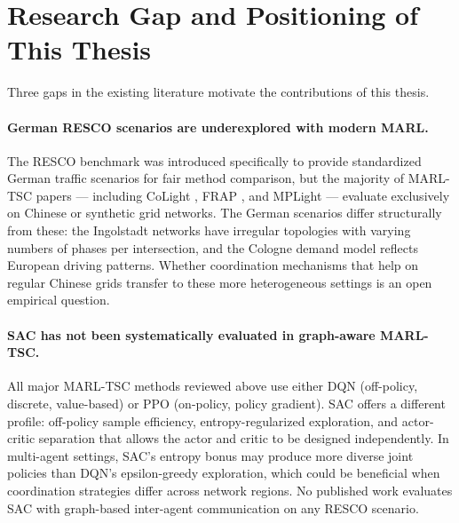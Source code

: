 \section{Research Gap and Positioning of This Thesis}
\label{sec:LiteratureReview_ResearchGap}

Three gaps in the existing literature motivate the contributions of this thesis.

\paragraph{German RESCO scenarios are underexplored with modern MARL.}
The RESCO benchmark \citep{ault2021reinforcement} was introduced specifically to provide standardized German traffic scenarios for fair method comparison, but the majority of MARL-TSC papers — including CoLight \citep{wei2019colight}, FRAP \citep{zheng2019learning}, and MPLight \citep{chen2020toward} — evaluate exclusively on Chinese or synthetic grid networks. The German scenarios differ structurally from these: the Ingolstadt networks have irregular topologies with varying numbers of phases per intersection, and the Cologne demand model reflects European driving patterns. Whether coordination mechanisms that help on regular Chinese grids transfer to these more heterogeneous settings is an open empirical question.

\paragraph{SAC has not been systematically evaluated in graph-aware MARL-TSC.}
All major MARL-TSC methods reviewed above use either DQN (off-policy, discrete, value-based) or PPO (on-policy, policy gradient). SAC offers a different profile: off-policy sample efficiency, entropy-regularized exploration, and actor-critic separation that allows the actor and critic to be designed independently. In multi-agent settings, SAC's entropy bonus may produce more diverse joint policies than DQN's epsilon-greedy exploration, which could be beneficial when coordination strategies differ across network regions. No published work evaluates SAC with graph-based inter-agent communication on any RESCO scenario.

